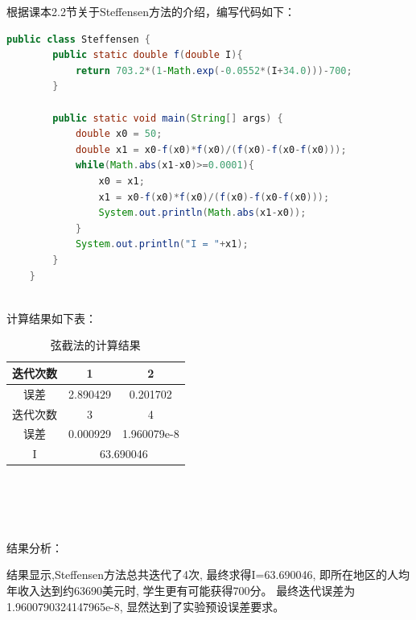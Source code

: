 \documentclass[12pt,a4paper]{article}
\begin{document}
根据课本2.2节关于Steffensen方法的介绍，编写代码如下：
\begin{lstlisting}[language={java}]
    public class Steffensen {
        public static double f(double I){
            return 703.2*(1-Math.exp(-0.0552*(I+34.0)))-700;
        }
    
        public static void main(String[] args) {
            double x0 = 50;
            double x1 = x0-f(x0)*f(x0)/(f(x0)-f(x0-f(x0)));
            while(Math.abs(x1-x0)>=0.0001){
                x0 = x1;
                x1 = x0-f(x0)*f(x0)/(f(x0)-f(x0-f(x0)));
                System.out.println(Math.abs(x1-x0));
            }
            System.out.println("I = "+x1);
        }
    }
\end{lstlisting}
~\\
计算结果如下表：
\begin{table}[ht]
    \centering
    \begin{tabular}{|c|c|c|} 
     \hline
     迭代次数 & 1 & 2 \\ [0.5ex] 
     \hline
     误差 & 2.890429 & 0.201702 \\ 
     \hline
     迭代次数 & 3 & 4 \\
     \hline
     误差 & 0.000929 & 1.960079e-8 \\
     \hline
     I & \multicolumn{2}{c|}{63.690046} \\
     \hline
    \end{tabular}
    \caption{弦截法的计算结果}
    \label{table:3}
\end{table}
~\\~\\~\\~\\
结果分析：

结果显示,Steffensen方法总共迭代了4次,
最终求得I=63.690046,
即所在地区的人均年收入达到约63690美元时,
学生更有可能获得700分。
最终迭代误差为1.9600790324147965e-8,
显然达到了实验预设误差要求。
\end{document}

